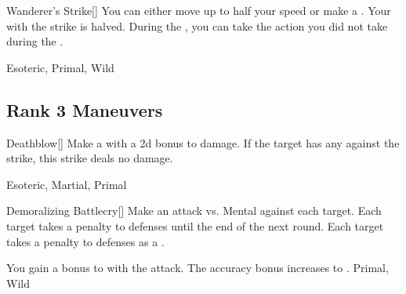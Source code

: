 \lowercase{\hypertarget{maneuver:Wanderer's Strike}{}}\label{maneuver:Wanderer's Strike}
\hypertarget{maneuver:Wanderer's Strike}{}
\begin{freeability}[Rank 2]{Wanderer's Strike}[]
You can either move up to half your speed or make a .
Your  with the strike is halved.
During the , you can take the action you did not take during the .


 Esoteric, Primal, Wild
\end{freeability}
\vspace{0.25em}


\subsection{Rank 3 Maneuvers}

\lowercase{\hypertarget{maneuver:Deathblow}{}}\label{maneuver:Deathblow}
\hypertarget{maneuver:Deathblow}{}
\begin{freeability}[Rank 3]{Deathblow}[]
Make a  with a \plus2d bonus to damage.
If the target has any  against the strike, this strike deals no damage.


 Esoteric, Martial, Primal
\end{freeability}
\vspace{0.25em}



\lowercase{\hypertarget{maneuver:Demoralizing Battlecry}{}}\label{maneuver:Demoralizing Battlecry}
\hypertarget{maneuver:Demoralizing Battlecry}{}
\begin{freeability}[Rank 3]{Demoralizing Battlecry}[]
Make an attack vs. Mental against each target.
\hit Each target takes a  penalty to defenses until the end of the next round.
\crit Each target takes a  penalty to defenses as a .

\rankline
{} You gain a  bonus to  with the attack.
 The accuracy bonus increases to .
 Primal, Wild
\end{freeability}
\vspace{0.25em}



